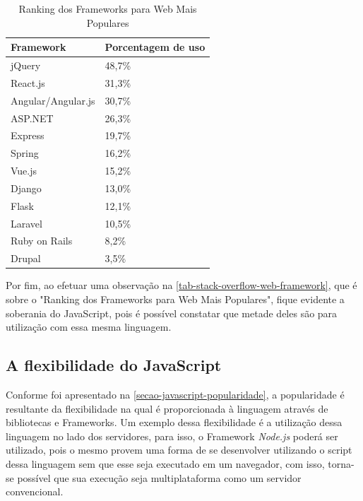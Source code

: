 \begin{table}[htb]
\ABNTEXfontereduzida
\caption[Ranking dos Frameworks para Web Mais Populares]{Ranking dos Frameworks para Web Mais Populares}
\label{tab-stack-overflow-web-framework}
\begin{tabular}{p{5cm}|p{4cm}}
   \textbf{Framework} & \textbf{Porcentagem de uso}  \\
    \hline
    jQuery & 48,7\%  \\
    \hline
    React.js & 31,3\%  \\
    \hline
    Angular/Angular.js & 30,7\%  \\
    \hline
    ASP.NET & 26,3\%  \\
    \hline
    Express & 19,7\%  \\
    \hline
    Spring & 16,2\%  \\
    \hline
    Vue.js & 15,2\%  \\
    \hline
    Django & 13,0\%  \\
    \hline
    Flask & 12,1\%  \\
    \hline
    Laravel & 10,5\%  \\
    \hline
    Ruby on Rails & 8,2\%  \\
    \hline
    Drupal & 3,5\%  \\
\end{tabular}
\end{table}

\newpage
Por fim, ao efetuar uma observação na \autoref{tab-stack-overflow-web-framework}, que é sobre o "Ranking dos Frameworks para Web Mais Populares", fique evidente a soberania do JavaScript, pois é possível constatar que metade deles são para utilização com essa mesma linguagem.

\subsection{A flexibilidade do JavaScript}
\label{sec-javascript-flexibilidade}

Conforme foi apresentado na \autoref{secao-javascript-popularidade}, a popularidade é resultante da flexibilidade na qual é proporcionada à linguagem através de bibliotecas e Frameworks. Um exemplo dessa flexibilidade é a utilização dessa linguagem no lado dos servidores, para isso, o Framework \textit{Node.js} poderá ser utilizado, pois o mesmo provem uma forma de se desenvolver utilizando o script dessa linguagem sem que esse seja executado em um navegador, com isso, torna-se possível que sua execução seja multiplataforma como um servidor convencional.

